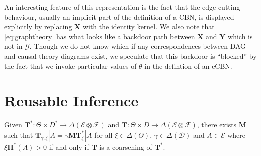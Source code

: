 An interesting feature of this representation is the fact that the edge cutting behaviour, usually an implicit part of the definition of a CBN, is displayed explicitly by replacing $\mathbf{X}$ with the identity kernel. We also note that \ref{eq:graphtheory} has what looks like a backdoor path between $\mathbf{X}$ and $\mathbf{Y}$ which is not in $\mathcal{G}$. Though we do not know which if any correspondences between DAG and causal theory diagrams exist, we speculate that this backdoor is ``blocked'' by the fact that we invoke particular values of $\theta$ in the defintion of an eCBN.

\section{Reusable Inference}\label{sec:reu_inf}

\begin{theorem}
Given $\mathbf{T}^*:\Theta\times D^*\to \Delta(\mathcal{E}\otimes\mathcal{F})$ and $\mathbf{T}:\Theta\times D\to \Delta(\mathcal{E}\otimes\mathcal{F})$, there exists $\mathbf{M}$ such that $\mathbf{T}_{\gamma,\xi} | A = \gamma \mathbf{M} \mathbf{T}^*_\xi|A$ for all $\xi\in\Delta(\Theta)$, $\gamma\in\Delta(\mathcal{D})$ and $A\in \mathcal{E}$ where $\xi \mathbf{H}^* (A) > 0$  if and only if $\mathbf{T}$ is a coarsening of $\mathbf{T}^*$.
\end{theorem}

